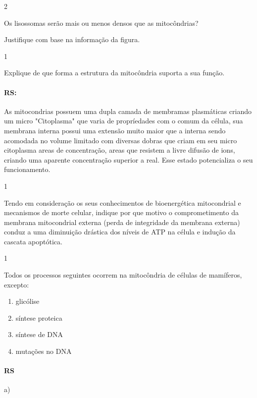 \documentclass[\mainfilename]{subfiles}
\begin{document}
\begin{questionBox}2{} %
    
    Os lisossomas serão mais ou menos densos que as mitocôndrias?
    


    Justifique com base na informação da figura.

\end{questionBox}

\begin{questionBox}1{} %
    
    Explique de que forma a estrutura da mitocôndria suporta a sua função.
    
    \paragraph*{RS:} As mitocondrias possuem uma dupla camada de membramas plasmáticas criando um micro "Citoplasma" que varia de propríedades com o comum da célula, sua membrana interna possui uma extensão muito maior que a interna sendo acomodada no volume limitado com diversas dobras que criam em seu micro citoplasma areas de concentração, areas que resistem a livre difusão de ions, criando uma aparente concentração superior a real. Esse estado potencializa o seu funcionamento.

\end{questionBox}

\begin{questionBox}1{} %
    
    Tendo em consideração os seus conhecimentos de bioenergética mitocondrial e mecanismos de morte celular, indique por que motivo o comprometimento da membrana mitocondrial externa (perda de integridade da membrana externa) conduz a uma diminuição drástica dos níveis de ATP na célula e indução da cascata apoptótica.

    
    
\end{questionBox}

\begin{questionBox}1{} %
    
    Todos os processos seguintes ocorrem na mitocôndria de células de mamíferos, excepto:

    \begin{enumerate}[label=\alph{enumi})]
        \item glicólise
        \item síntese proteica 
        \item síntese de DNA 
        \item mutações no DNA
    \end{enumerate}

    \paragraph*{RS} a)
    
\end{questionBox}
\end{document}
